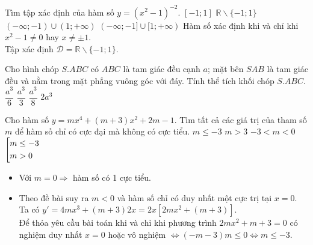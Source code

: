 \begin{ex}%
Tìm tập xác định của hàm số $ y = \left(x^2-1\right)^{-2}. $
\choice
{$ \left[-1;1\right] $}
{\True $ \mathbb{R} \backslash \{-1;1\} $}
{$ (-\infty;-1) \cup (1;+\infty) $}
{$ (-\infty;-1] \cup [1;+\infty) $}
\loigiai
	{Hàm số xác định khi và chỉ khi $ x^2 - 1 \neq 0  $ hay $ x \neq \pm 1. $\\
Tập xác định $ \mathscr D =  \mathbb{R} \backslash \{-1;1\}$.
	}
\end{ex}
\begin{ex}%
Cho hình chóp $ S.ABC $ có $ ABC $ là tam giác đều cạnh $ a $; mặt bên $ SAB $ là tam giác đều và nằm trong mặt phẳng vuông góc với đáy. Tính thể tích khối chóp $ S.ABC. $
\choice
{$ \dfrac{a^3}{6} $}
{$ \dfrac{a^3}{3} $}
{\True $ \dfrac{a^3}{8} $}
 {$ 2a^3 $}
 	\loigiai
	{
{}		
	}
\end{ex}
\begin{ex}%
Cho hàm số $ y = mx^4 + (m+3)x^2 + 2m - 1 $. Tìm tất cả các giá trị của tham số $ m $ để hàm số chỉ có cực đại mà không có cực tiểu.
\choice
{\True $ m \le -3 $}
{$ m>3 $}
{$ -3<m<0 $}
{$ \left[\begin{aligned}&m \le -3 \\&m>0\end{aligned}\right. $}
\loigiai
	{
\begin{itemize}
	\item Với $ m = 0 \Rightarrow  $ hàm số có 1 cực tiểu.
	\item Theo đề bài suy ra $ m < 0 $ và hàm số chỉ có duy nhất một cực trị tại $ x = 0 $.\\
	Ta có $ y' = 4mx^3 +(m+3)2x = 2x \left[2mx^2 + (m+3)\right]$.\\
	Để thỏa yêu cầu bài toán khi và chỉ khi phương trình $ 2mx^2 + m+3 = 0 $ có nghiệm duy nhất $ x = 0 $ hoặc vô nghiệm $ \Leftrightarrow (-m-3)m \le 0 \Leftrightarrow m \leq -3. $
\end{itemize}
	}
\end{ex}
